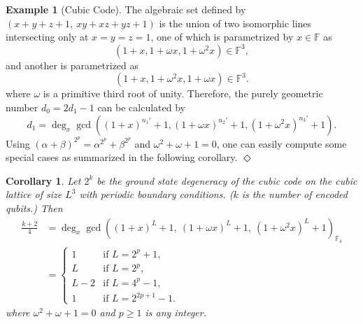 \documentclass[letterpaper,12pt]{amsart}
\newtheorem{cor}[lem]{Corollary}
\theoremstyle{definition} \newtheorem{defn}{Definition}
\theoremstyle{definition} \newtheorem{rem}{Remark}
\theoremstyle{definition} \newtheorem{example}{Example}
\newcommand{\FF}{\mathbb{F}}
\begin{document}
\begin{example}[Cubic Code]
The algebraic set defined by $(x+y+z+1,~xy+xz+yz+1)$ is the union of two isomorphic lines
intersecting only at $x=y=z=1$, one of which is parametrized by $x \in \FF$ as
\[
 (1+x, 1+\omega x, 1+\omega^2 x) \in \FF^3,
\]
and another is parametrized as
\[
 (1+x,1+\omega^2 x, 1+\omega x) \in \FF^3.
\]
where $\omega$ is a primitive third root of unity.
Therefore, the purely geometric number $d_0 = 2 d_1 -1$ can be calculated by
\[
 d_1 = \deg_x \gcd \left( (1+x)^{n_1'}+1, (1+\omega x)^{n_2'}+1, (1+\omega^2 x)^{n_3'}+1 \right) .
\]
Using $(\alpha+\beta)^{2^p} = \alpha^{2^p} + \beta^{2^p}$ and $\omega^2 + \omega + 1 = 0$,
one can easily compute some special cases as summarized in the following corollary.
\hfill $\Diamond$
\end{example}

\begin{cor}
Let $2^k$ be the ground state degeneracy of
the cubic code on the cubic lattice of size $L^3$ with periodic boundary conditions.
($k$ is the number of encoded qubits.)
Then
\begin{align*}
\frac{k+2}{4} 
&= \deg_x \gcd \left( (1+x)^{L}+1,~ (1+\omega x)^{L}+1,~ (1+\omega^2 x)^{L}+1 \right)_{\FF_4} \\
&= \begin{cases}
     1    & \text{if $L = 2^p+1$}, \\
     L    & \text{if $L =2^p$}, \\
     L-2  & \text{if $L = 4^p -1$}, \\
     1    & \text{if $L = 2^{2p+1} -1$}.
   \end{cases}
\label{eq:cubic-code-formula-k}
\end{align*}
where $\omega^2 + \omega + 1 = 0$ and $p \ge 1$ is any integer.
\end{cor}
\end{document}
